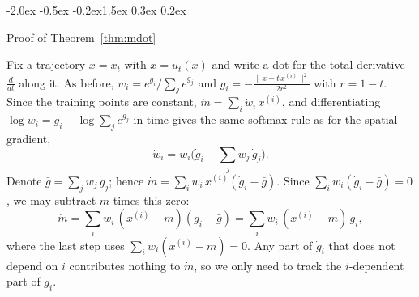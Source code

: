 \documentclass{article}
\makeatletter
\renewcommand{\section}{\@startsection{section}{1}{\z@}%
  {-2.0ex \@plus -0.5ex \@minus -0.2ex}{1.5ex \@plus 0.3ex \@minus 0.2ex}{\large\bfseries\raggedright}}
\theoremstyle{remark}
\newcommand{\xn}[1]{x^{(#1)}}
\makeatother
\begin{document}
\section{Proof of Theorem~\ref{thm:mdot}}\label{app:mdot}

Fix a trajectory $x = x_t$ with $\dot x = u_t(x)$ and write a dot for the total derivative $\frac{d}{dt}$ along it. As before, $w_i = e^{g_i}/\sum_je^{g_j}$ and $g_i = -\frac{\|x - t\,\xn{i}\|^2}{2r^2}$ with $r = 1 - t$. Since the training points are constant, $\dot m = \sum_i\dot w_i\,\xn{i}$, and differentiating $\log w_i = g_i - \log\sum_je^{g_j}$ in time gives the same softmax rule as for the spatial gradient,
\[
  \dot w_i = w_i\Big(\dot g_i - \sum_jw_j\,\dot g_j\Big).
\]
Denote $\bar g = \sum_jw_j\,\dot g_j$; hence $\dot m = \sum_iw_i\,\xn{i}(\dot g_i - \bar g)$. Since $\sum_iw_i(\dot g_i - \bar g) = 0$, we may subtract $m$ times this zero:
\[
  \dot m = \sum_iw_i\,(\xn{i} - m)(\dot g_i - \bar g) = \sum_iw_i\,(\xn{i} - m)\,\dot g_i ,
\]
where the last step uses $\sum_iw_i(\xn{i} - m) = 0$. Any part of $\dot g_i$ that does not depend on $i$ contributes nothing to $\dot m$, so we only need to track the $i$-dependent part of $\dot g_i$.
\end{document}
